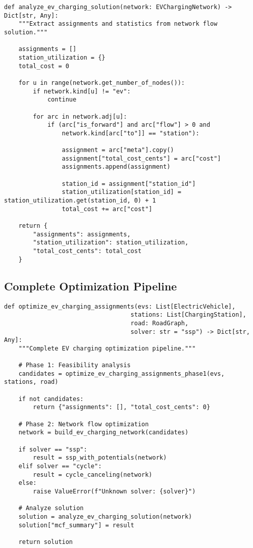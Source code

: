 \documentclass[12pt,a4paper]{article}
\begin{document}
\begin{lstlisting}[caption=Solution Analysis]
def analyze_ev_charging_solution(network: EVChargingNetwork) -> Dict[str, Any]:
    """Extract assignments and statistics from network flow solution."""
    
    assignments = []
    station_utilization = {}
    total_cost = 0
    
    for u in range(network.get_number_of_nodes()):
        if network.kind[u] != "ev":
            continue
            
        for arc in network.adj[u]:
            if (arc["is_forward"] and arc["flow"] > 0 and 
                network.kind[arc["to"]] == "station"):
                
                assignment = arc["meta"].copy()
                assignment["total_cost_cents"] = arc["cost"]
                assignments.append(assignment)
                
                station_id = assignment["station_id"]
                station_utilization[station_id] = station_utilization.get(station_id, 0) + 1
                total_cost += arc["cost"]
    
    return {
        "assignments": assignments,
        "station_utilization": station_utilization,
        "total_cost_cents": total_cost
    }
\end{lstlisting}

\subsection{Complete Optimization Pipeline}

\begin{lstlisting}[caption=Main Optimization Function]
def optimize_ev_charging_assignments(evs: List[ElectricVehicle],
                                   stations: List[ChargingStation],
                                   road: RoadGraph,
                                   solver: str = "ssp") -> Dict[str, Any]:
    """Complete EV charging optimization pipeline."""
    
    # Phase 1: Feasibility analysis
    candidates = optimize_ev_charging_assignments_phase1(evs, stations, road)
    
    if not candidates:
        return {"assignments": [], "total_cost_cents": 0}
    
    # Phase 2: Network flow optimization
    network = build_ev_charging_network(candidates)
    
    if solver == "ssp":
        result = ssp_with_potentials(network)
    elif solver == "cycle":
        result = cycle_canceling(network)
    else:
        raise ValueError(f"Unknown solver: {solver}")
    
    # Analyze solution
    solution = analyze_ev_charging_solution(network)
    solution["mcf_summary"] = result
    
    return solution
\end{lstlisting}
\end{document}
